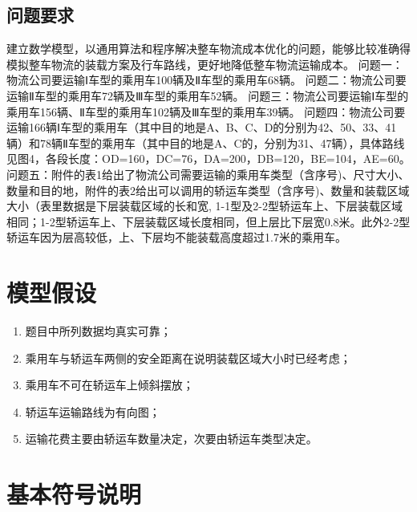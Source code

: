 \documentclass[UTF8]{ctexart}
\begin{document}


\subsection{问题要求}
建立数学模型，以通用算法和程序解决整车物流成本优化的问题，能够比较准确得模拟整车物流的装载方案及行车路线，更好地降低整车物流运输成本。
问题一：物流公司要运输Ⅰ车型的乘用车100辆及Ⅱ车型的乘用车68辆。
问题二：物流公司要运输Ⅱ车型的乘用车72辆及Ⅲ车型的乘用车52辆。
问题三：物流公司要运输Ⅰ车型的乘用车156辆、Ⅱ车型的乘用车102辆及Ⅲ车型的乘用车39辆。
问题四：物流公司要运输166辆Ⅰ车型的乘用车（其中目的地是A、B、C、D的分别为42、50、33、41辆）和78辆Ⅱ车型的乘用车（其中目的地是A、C的，分别为31、47辆），具体路线见图4，各段长度：OD=160，DC=76，DA=200，DB=120，BE=104，AE=60。
问题五：附件的表1给出了物流公司需要运输的乘用车类型（含序号)、尺寸大小、数量和目的地，附件的表2给出可以调用的轿运车类型（含序号)、数量和装载区域大小（表里数据是下层装载区域的长和宽, 1-1型及2-2型轿运车上、下层装载区域相同；1-2型轿运车上、下层装载区域长度相同，但上层比下层宽0.8米。此外2-2型轿运车因为层高较低，上、下层均不能装载高度超过1.7米的乘用车。

\section{模型假设}
\begin{enumerate}
	\item 	题目中所列数据均真实可靠；
	\item	乘用车与轿运车两侧的安全距离在说明装载区域大小时已经考虑；
	\item	乘用车不可在轿运车上倾斜摆放；
	\item	轿运车运输路线为有向图；
	\item	运输花费主要由轿运车数量决定，次要由轿运车类型决定。

\end{enumerate}

\section{基本符号说明}
\end{document}
